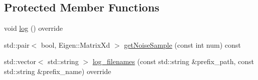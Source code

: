 \subsection*{Protected Member Functions}
\begin{DoxyCompactItemize}
\item 
void \mbox{\hyperlink{classbfl_1_1SimulatedLinearSensor_ab75bbe744d8516c97dfc90ad499b10e6}{log}} () override
\item 
std\+::pair$<$ bool, Eigen\+::\+Matrix\+Xd $>$ \mbox{\hyperlink{classbfl_1_1LinearModel_af248dfa32cd9145d87e84ddade6316ad}{get\+Noise\+Sample}} (const int num) const
\item 
std\+::vector$<$ std\+::string $>$ \mbox{\hyperlink{classbfl_1_1LinearModel_a8b8f645a7b7d8ebbb02c8958428fcf10}{log\+\_\+filenames}} (const std\+::string \&prefix\+\_\+path, const std\+::string \&prefix\+\_\+name) override
\end{DoxyCompactItemize}
